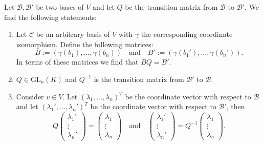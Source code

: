    \begin{property}\label{linalgebra:theorem:transition_matrix}
        Let $\mathcal{B}, \mathcal{B}'$ be two bases of $V$ and let $Q$ be the transition matrix from $\mathcal{B}$ to $\mathcal{B}'$. We find the following statements:
        \begin{enumerate}
            \item Let $\mathcal{C}$ be an arbitrary basis of $V$ with $\gamma$ the corresponding coordinate isomorphism. Define the following matrices: \[B:=(\gamma(b_1), \ldots, \gamma(b_n))\quad\text{and}\quad B':=(\gamma(b_1'), \ldots, \gamma(b_n')).\] In terms of these matrices we find that $BQ = B'$.
            \item $Q\in\text{GL}_n(K)$ and $Q^{-1}$ is the transition matrix from $\mathcal{B}'$ to $\mathcal{B}$.
            \item Consider $v\in V$. Let $(\lambda_1, \ldots, \lambda_n)^T$ be the coordinate vector with respect to $\mathcal{B}$ and let $(\lambda_1', \ldots, \lambda_n')^T$ be the coordinate vector with respect to $\mathcal{B}'$, then
                \[
                    Q\left(
                    \begin{array}{c}
                        \lambda_1'\\
                        \vdots\\
                        \lambda_n'
                    \end{array}
                    \right)
                    =
                    \left(
                    \begin{array}{c}
                        \lambda_1\\
                        \vdots\\
                        \lambda_n
                    \end{array}
                    \right)\quad\text{and}\quad\left(
                    \begin{array}{c}
                        \lambda_1'\\
                        \vdots\\
                        \lambda_n'
                    \end{array}
                    \right)=Q^{-1}\left(
                    \begin{array}{c}
                        \lambda_1\\
                        \vdots\\
                        \lambda_n
                    \end{array}
                    \right).
                \]
        \end{enumerate}
    \end{property}

